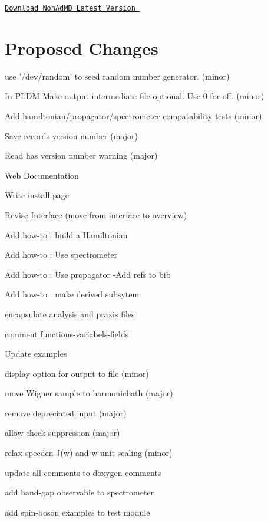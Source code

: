 \href{https://github.com/dmontemayor/nonadmd}{\tt Download Non\+Ad\+M\+D Latest Version }\hypertarget{_tags_Wishlist}{}\section{Proposed Changes}\label{_tags_Wishlist}

\begin{DoxyItemize}
\item use '/dev/random' to seed random number generator. (minor)
\item In P\+L\+D\+M Make output intermediate file optional. Use 0 for off. (minor)
\item Add hamiltonian/propagator/spectrometer compatability tests (minor)
\item Save records version number (major)
\item Read has version number warning (major)
\item Web Documentation
\begin{DoxyItemize}
\item Write install page
\item Revise Interface (move from interface to overview)
\begin{DoxyItemize}
\item Add how-\/to \+: build a Hamiltonian
\item Add how-\/to \+: Use spectrometer
\item Add how-\/to \+: Use propagator -\/\+Add refs to bib
\end{DoxyItemize}
\item Add how-\/to \+: make derived subsytem
\item encapsulate analysis and praxis files
\item comment functions-\/variabels-\/fields
\end{DoxyItemize}
\item Update examples
\item display option for output to file (minor)
\item move Wigner sample to harmonicbath (major)
\item remove depreciated input (major)
\item allow check suppression (major)
\item relax specden J(w) and w unit scaling (minor)
\item update all comments to doxygen comments
\item add band-\/gap observable to spectrometer
\item add spin-\/boson examples to test module

\end{DoxyItemize}
